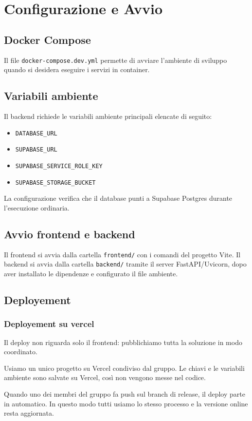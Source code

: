 \documentclass[oneside]{supsistudent}
\begin{document}
\chapter{Configurazione e Avvio}

\section{Docker Compose}
Il file \texttt{docker-compose.dev.yml} permette di avviare l'ambiente di sviluppo quando si desidera eseguire i servizi in container.

\section{Variabili ambiente}
Il backend richiede le variabili ambiente principali elencate di seguito:
\begin{itemize}
    \item \texttt{DATABASE\_URL}
    \item \texttt{SUPABASE\_URL}
    \item \texttt{SUPABASE\_SERVICE\_ROLE\_KEY}
    \item \texttt{SUPABASE\_STORAGE\_BUCKET}
\end{itemize}
La configurazione verifica che il database punti a Supabase Postgres durante l'esecuzione ordinaria.

\section{Avvio frontend e backend}
Il frontend si avvia dalla cartella \texttt{frontend/} con i comandi del progetto Vite. Il backend si avvia dalla cartella
\texttt{backend/} tramite il server FastAPI/Uvicorn, dopo aver installato le dipendenze e configurato il file ambiente.

\section{Deployement}

\subsection{Deployement su vercel}
Il deploy non riguarda solo il frontend: pubblichiamo tutta la soluzione in modo coordinato.

Usiamo un unico progetto su Vercel condiviso dal gruppo.
Le chiavi e le variabili ambiente sono salvate su Vercel, così non vengono messe nel codice.

Quando uno dei membri del gruppo fa push sul branch di release, il deploy parte in automatico.
In questo modo tutti usiamo lo stesso processo e la versione online resta aggiornata.
\end{document}
